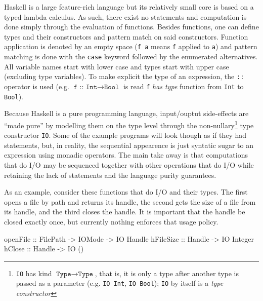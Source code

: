 \documentclass[]{lwnovathesis}
\begin{document}
Haskell is a large feature-rich language but its relatively small core is based on a typed lambda
calculus. As such, there exist no statements and computation is done simply
through the evaluation of functions. Besides functions, one can define types and
their constructors and pattern match on said constructors. Function application
is denoted by an empty space (\texttt{f~a} means \texttt{f} applied to
\texttt{a}) and pattern matching is done with the \texttt{case} keyword followed
by the enumerated alternatives. All variable names start with lower case and
types start with upper case (excluding type variables). To make explicit the
type of an expression, the \texttt{::} operator is used (e.g.
$\texttt{f~::~Int}\to \texttt{Bool}$ is read \texttt{f} \emph{has type} function
from \texttt{Int} to \texttt{Bool}).

Because Haskell is a pure programming language, input/ouptut side-effects are
``made pure'' by modelling them on the type level through the
non-nullary\footnote{\texttt{IO} has kind $\texttt{Type}\to\texttt{Type}$,
that is, it is only a type after another type is passed as a parameter (e.g.
\texttt{IO~Int}, \texttt{IO~Bool}); \texttt{IO} by itself is a \emph{type
constructor}} type constructor \texttt{IO}.
Some of the example programs will look though as
if they had statements, but, in reality, the sequential appearence is just
syntatic sugar to an expression using monadic operators. The main take away is
that computations that do I/O may be sequenced together with other operations
that do I/O while retaining the lack of statements and the language purity
guarantees.


As an example, consider these functions that do I/O and their types. The first
opens a file by path and returns its handle, the second gets the size of a file
from its handle, and the third closes the handle. It is important that the
handle be closed exactly once, but currently nothing enforces that usage policy.

\begin{code}
openFile :: FilePath -> IOMode -> IO Handle
hFileSize :: Handle -> IO Integer
hClose   :: Handle -> IO ()
\end{code}
\end{document}
